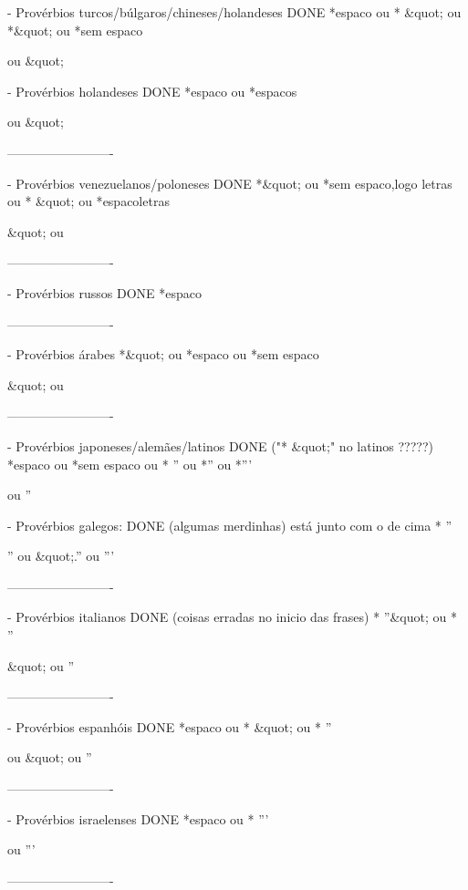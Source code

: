 - Provérbios turcos/búlgaros/chineses/holandeses                DONE
*{espaco} ou * &quot; ou *&quot; ou *{sem espaco}

\n ou &quot;

- Provérbios holandeses                                         DONE
*{espaco} ou *{espacos}

\n ou &quot;


-------------------------


- Provérbios venezuelanos/poloneses                                       DONE
*&quot; ou *{sem espaco,logo letras} ou * &quot; ou *{espaco}{letras}

&quot; ou \n


-------------------------


- Provérbios russos                                                      DONE
*{espaco}

\n


-------------------------


- Provérbios árabes
*&quot; ou *{espaco} ou *{sem espaco}

&quot; ou \n


-------------------------


- Provérbios japoneses/alemães/latinos                                   DONE ("* &quot;" no latinos ?????)
*{espaco} ou *{sem espaco} ou * '' ou *'' ou *'''

\n ou ''\n

- Provérbios galegos:                                                    DONE (algumas merdinhas) está junto com o de cima
* ''

'' ou &quot;.'' ou '''


-------------------------


- Provérbios italianos                                                   DONE (coisas erradas no inicio das frases)
* ''&quot; ou * ''

&quot; ou ''\n


-------------------------


- Provérbios espanhóis                                                   DONE
*{espaco} ou * &quot; ou * ''

\n ou &quot; ou ''\n


-------------------------


- Provérbios israelenses                                                 DONE
*{espaco} ou * '''

\n ou '''\n


-------------------------


